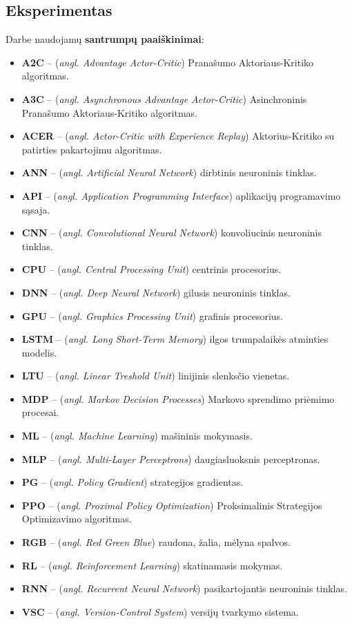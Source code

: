 \documentclass{VUMIFPSbakalaurinis}
\begin{document}
\subsection{Eksperimentas}

\printbibliography[heading=bibintoc] 

{
	Darbe naudojamų \textbf{santrumpų paaiškinimai}:
	\begin{itemize}
		\item \textbf{A2C} -- (\textit{angl. Advantage Actor-Critic}) Pranašumo Aktoriaus-Kritiko algoritmas.
		\item \textbf{A3C} -- (\textit{angl. Asynchronous Advantage Actor-Critic}) Asinchroninis Pranašumo Aktoriaus-Kritiko algoritmas.
		\item \textbf{ACER} -- (\textit{angl. Actor-Critic with Experience Replay}) Aktorius-Kritiko su patirties pakartojimu algoritmas.
		\item \textbf{ANN} -- (\textit{angl. Artificial Neural Network}) dirbtinis neuroninis tinklas.
		\item \textbf{API} -- (\textit{angl. Application Programming Interface}) aplikacijų programavimo sąsaja.
		\item \textbf{CNN} -- (\textit{angl. Convolutional Neural Network}) konvoliucinis neuroninis tinklas.
		\item \textbf{CPU} -- (\textit{angl. Central Processing Unit}) centrinis procesorius.
		\item \textbf{DNN} -- (\textit{angl. Deep Neural Network}) gilusis neuroninis tinklas.
		\item \textbf{GPU} -- (\textit{angl. Graphics Processing Unit}) grafinis procesorius.
		\item \textbf{LSTM} -- (\textit{angl. Long Short-Term Memory}) ilgos trumpalaikės atminties modelis.
		\item \textbf{LTU} -- (\textit{angl. Linear Treshold Unit}) linijinis slenksčio vienetas.
		\item \textbf{MDP} -- (\textit{angl. Markov Decision Processes}) Markovo sprendimo priėmimo procesai.
		\item \textbf{ML} -- (\textit{angl. Machine Learning}) mašininis mokymasis.
		\item \textbf{MLP} -- (\textit{angl. Multi-Layer Perceptrons}) daugiasluoksnis perceptronas.
		\item \textbf{PG} -- (\textit{angl. Policy Gradient}) strategijos gradientas.
		\item \textbf{PPO} -- (\textit{angl. Proximal Policy Optimization}) Proksimalinis Strategijos Optimizavimo algoritmas.
		\item \textbf{RGB} -- (\textit{angl. Red Green Blue}) raudona, žalia, mėlyna spalvos.
		\item \textbf{RL} -- (\textit{angl. Reinforcement Learning}) skatinamasis mokymas.
		\item \textbf{RNN} -- (\textit{angl. Recurrent Neural Network}) pasikartojantis neuroninis tinklas.
		\item \textbf{VSC} -- (\textit{angl. Version-Control System}) versijų tvarkymo sistema.
	\end{itemize}
}
\end{document}
